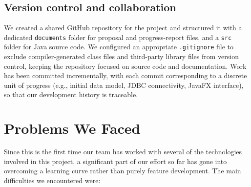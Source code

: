 \documentclass[11pt,a4paper]{article}
\begin{document}
\subsection{Version control and collaboration}
We created a shared GitHub repository for the project and structured it with a dedicated \texttt{documents} folder for proposal and progress-report files, and a \texttt{src} folder for Java source code. We configured an appropriate \texttt{.gitignore} file to exclude compiler-generated class files and third-party library files from version control, keeping the repository focused on source code and documentation. Work has been committed incrementally, with each commit corresponding to a discrete unit of progress (e.g., initial data model, JDBC connectivity, JavaFX interface), so that our development history is traceable.

\section{Problems We Faced}

Since this is the first time our team has worked with several of the technologies involved in this project, a significant part of our effort so far has gone into overcoming a learning curve rather than purely feature development. The main difficulties we encountered were:
\end{document}
